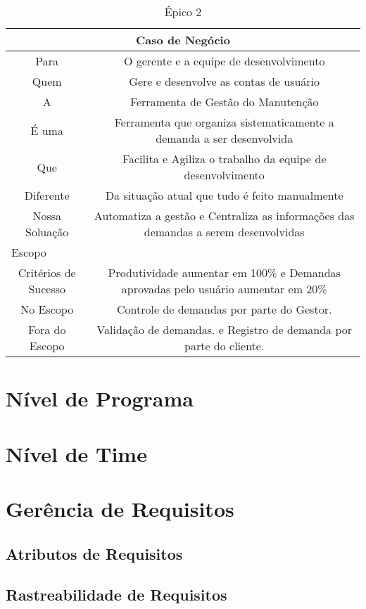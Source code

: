 \begin{table}[H]
\centering
\caption{Épico 2}
\label{epic:segundo}
\begin{tabular}{|c|c|}
\hline
\multicolumn{2}{|m{4cm}|}{\textbf{Caso de Negócio}} \\ \hline
  Para   &   O gerente e a equipe de desenvolvimento        \\ \hline
  Quem         &    Gere e desenvolve as contas de usuário        \\ \hline
    A       &     Ferramenta de Gestão do Manutenção    \\ \hline
      É uma     &    Ferramenta que organiza sistematicamente a demanda a ser desenvolvida \\ \hline
      Que     &     Facilita e Agiliza o trabalho da equipe de desenvolvimento \\ \hline
      Diferente   &     Da situação atual que tudo é feito manualmente     \\ \hline
      Nossa Soluação  &   Automatiza a gestão e Centraliza as informações das demandas a serem desenvolvidas    \\ \hline
\multicolumn{2}{|l|}{Escopo} \\ \hline
Critérios de Sucesso  &  Produtividade aumentar em 100\% e Demandas aprovadas pelo usuário aumentar em 20\%    \\ \hline
No Escopo & Controle de demandas por parte do Gestor. \\ \hline
Fora do Escopo  & Validação de demandas. e Registro de demanda por parte do cliente.     \\ \hline
\end{tabular}
\end{table}



\section{Nível de Programa}

\section{Nível de Time}

\section{Gerência de Requisitos}

\subsection{Atributos de Requisitos}

\subsection{Rastreabilidade de Requisitos}
